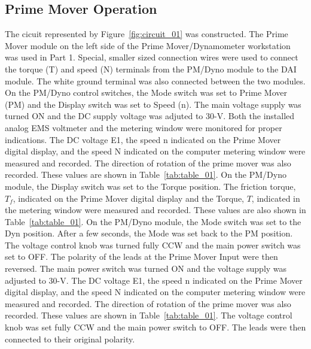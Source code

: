 \documentclass{article}
\begin{document}
\subsection{Prime Mover Operation}

\label{part1} The cicuit represented by Figure~\ref{fig:circuit_01} was
constructed. The Prime Mover module on the left side of the Prime
Mover/Dynamometer workstation was used in Part 1. Special, smaller sized
connection wires were used to connect the torque (T) and speed (N) terminals
from the PM/Dyno module to the DAI module. The white ground terminal was also
connected between the two modules. On the PM/Dyno control switches, the Mode
switch was set to Prime Mover (PM) and the Display switch was set to Speed (n).
The main voltage supply was turned ON and the DC supply voltage was adjuted to
30-V. Both the installed analog EMS voltmeter and the metering window were
monitored for proper indications. The DC voltage E1, the speed n indicated on
the Prime Mover digital display, and the speed N indicated on the computer
metering window were measured and recorded. The direction of rotation of the
prime mover was also recorded. These values are shown in
Table~\ref{tab:table_01}. On the PM/Dyno module, the Display switch was set to
the Torque position.  The friction torque, $T_f$, indicated on the Prime Mover
digital display and the Torque, $T$, indicated in the metering window were
measured and recorded. These values are also shown in Table~\ref{tab:table_01}.
On the PM/Dyno module, the Mode switch was set to the Dyn position. After a few
seconds, the Mode was set back to the PM position. The voltage control knob was
turned fully CCW and the main power switch was set to {OFF}.  The polarity of
the leads at the Prime Mover Input were then reversed. The main power switch
was turned ON and the voltage supply was adjusted to 30-V. The DC voltage E1,
the speed n indicated on the Prime Mover digital display, and the speed N
indicated on the computer metering window were measured and recorded. The
direction of rotation of the prime mover was also recorded. These values are
shown in Table~\ref{tab:table_01}. The voltage control knob was set fully CCW
and the main power switch to {OFF}. The leads were then connected to their
original polarity.
\end{document}
